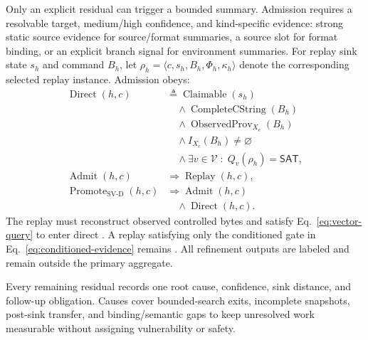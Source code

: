 Only an explicit residual can trigger a bounded summary. Admission requires a
resolvable target, medium/high confidence, and kind-specific evidence: strong
static source evidence for source/format summaries, a source slot for format
binding, or an explicit branch signal for environment summaries. For replay
sink state $s_h$ and command $B_h$, let
$\rho_h=\langle c,s_h,B_h,\Phi_h,\kappa_h\rangle$ denote the corresponding
selected replay instance. Admission obeys:
\begin{equation}
\begin{aligned}
\operatorname{Direct}(h,c)&\triangleq\operatorname{Claimable}(s_h)\\[-1mm]
 &\quad\land\operatorname{CompleteCString}(B_h)\\[-1mm]
 &\quad\land\operatorname{ObservedProv}_{X_c}(B_h)\\[-1mm]
 &\quad\land I_{X_c}(B_h)\neq\varnothing\\[-1mm]
 &\quad\land\exists v\in\mathcal V\;:\;
 Q_v(\rho_h)=\mathsf{SAT},\\[-1mm]
\operatorname{Admit}(h,c)&\Rightarrow\operatorname{Replay}(h,c),\\[-1mm]
\operatorname{Promote}_{\mathrm{SV\text{-}D}}(h,c)&\Rightarrow
 \operatorname{Admit}(h,c)\\[-1mm]
 &\quad\land\operatorname{Direct}(h,c).
\end{aligned}
\label{eq:refinement-admission}
\end{equation}
The replay must reconstruct observed controlled bytes and satisfy
Eq.~\ref{eq:vector-query} to enter direct \svsat. A replay satisfying only the
conditioned gate in Eq.~\ref{eq:conditioned-evidence} remains \ctsat. All
refinement outputs are labeled and remain outside the primary aggregate.

Every remaining residual records one root cause, confidence, sink distance, and
follow-up obligation. Causes cover bounded-search exits, incomplete snapshots,
post-sink transfer, and binding/semantic gaps to keep unresolved work measurable
without assigning vulnerability or safety.
